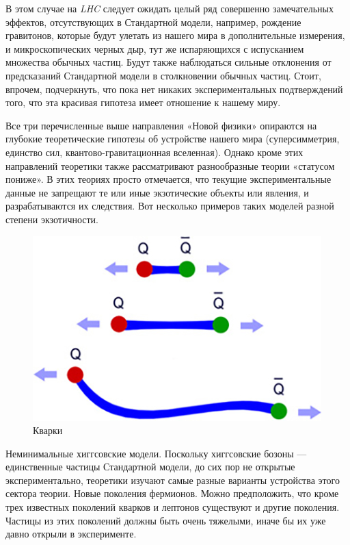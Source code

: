 В этом случае на \textit{LHC} следует ожидать целый ряд совершенно замечательных эффектов, отсутствующих в Стандартной модели, например, рождение гравитонов, которые будут улетать из нашего мира в дополнительные измерения, и микроскопических черных дыр, тут же испаряющихся с испусканием множества обычных частиц. Будут также наблюдаться сильные отклонения от предсказаний Стандартной модели в столкновении обычных частиц. Стоит, впрочем, подчеркнуть, что пока нет никаких экспериментальных подтверждений того, что эта красивая гипотеза имеет отношение к нашему миру.

Все три перечисленные выше направления «Новой физики» опираются на глубокие теоретические гипотезы об устройстве нашего мира (суперсимметрия, единство сил, квантово-гравитационная вселенная). Однако кроме этих направлений теоретики также рассматривают разнообразные теории «статусом пониже». В этих теориях просто отмечается, что текущие экспериментальные данные не запрещают те или иные экзотические объекты или явления, и разрабатываются их следствия. Вот несколько примеров таких моделей разной степени экзотичности.

\begin{figure}[h]
	\centering
	\includegraphics[width=\textwidth]{figures/quirk-antiquirk.jpg}
	\caption{Кварки}
	\label{fig:fig03}
\end{figure}

Неминимальные хиггсовские модели. Поскольку хиггсовские бозоны — единственные частицы Стандартной модели, до сих пор не открытые экспериментально, теоретики изучают самые разные варианты устройства этого сектора теории.
Новые поколения фермионов. Можно предположить, что кроме трех известных поколений кварков и лептонов существуют и другие поколения. Частицы из этих поколений должны быть очень тяжелыми, иначе бы их уже давно открыли в эксперименте.

